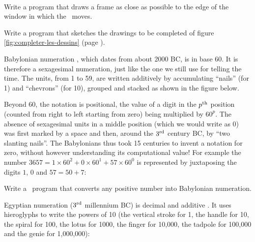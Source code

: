 \noindent\begin{exercices}{\ \\

\tiret Write a program that draws a frame as close as possible to the edge of the window in which
the \robot\ moves.

\tiret Write a program that sketches the drawings to be completed of figure \ref{fig:completer-les-dessins}
(page \pageref{fig:completer-les-dessins}).

\tiret Babylonian numeration \cite{guitel}, which dates from about 2000 BC, is in
base 60. It is therefore a sexagesimal numeration, just like the one we still use
for telling the time. The units, from 1 to 59, are written additively by accumulating ``nails'' (for
1) and ``chevrons'' (for 10), grouped and stacked as shown in the figure
below.\par\nopagebreak
\noindent\begin{minipage}[b][4.40cm]{\textwidth}\vfill{}\end{minipage}\par

\noindent Beyond 60, the notation is positional, the value of a digit in
the $p^{\rm th}$ position (counted from right to left starting from zero) being
multiplied by $60^{p}$. The absence of sexagesimal units in a middle position (which
we would write as 0) was first marked by a space and then, around the $3^{\rm rd}$
century BC, by ``two slanting nails''. The Babylonians thus took 15 centuries to
invent a notation for
zero, without however understanding its computational value! For example
the number $3657 = 1 \times 60^{2} + 0 \times 60^{1} + 57 \times 60^{0}$
is represented by juxtaposing the digits $1$, $0$ and
$57 = 50 + 7$:

\par\nopagebreak
\noindent\begin{minipage}[b][2.40cm]{\textwidth}\vfill{}\end{minipage}\par

Write a \python\ program that converts
any po\-si\-tive number into Babylonian nu\-mer\-a\-tion.

\tiret Egyptian numeration ($3^{\rm rd}$
millennium BC) is decimal and additive \cite{guitel}. It uses hieroglyphs to
write the
powers of 10 (the vertical stroke for 1, the handle for 10, the spiral for 100, the lotus for 1000,
the finger for 10,000,
the tadpole for 100,000 and the genie for 1,000,000):\par\nopagebreak
\noindent\begin{minipage}[b][3.50cm]{\textwidth}\vfill{}\end{minipage}\par

}
\end{exercices}
